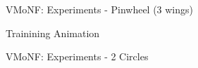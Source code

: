 \documentclass{beamer}
\begin{document}
\begin{frame}{VMoNF: Experiments - Pinwheel (3 wings)}
\protect\hypertarget{vmonf-experiments---pinwheel-3-wings}{}

\centering

Trainining Animation

\end{frame}

\begin{frame}{VMoNF: Experiments - 2 Circles}
\protect\hypertarget{vmonf-experiments---2-circles}{}

\centering
{}
\hfill
{}

\end{frame}
\end{document}
